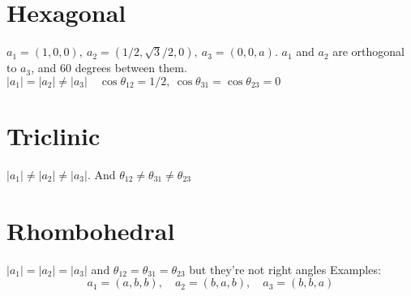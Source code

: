 \documentclass[main.tex]{subfiles}
\begin{document}
	
	\section{Hexagonal}
	$ a_1 = (1,0,0),\ a_2 = (1/2,\sqrt{3}/2,0),\ a_3 = (0,0,a) $. $a_1$ and $a_2$ are orthogonal to $a_3$, and 60 degrees between them.
	$|a_1| = |a_2| \neq |a_3| \quad \cos \theta_{12} = 1/2, \ \cos \theta_{31} = \cos \theta_{23} = 0$
	
	\section{Triclinic}
	$|a_1| \neq |a_2| \neq |a_3|$. And $\theta_{12} \neq \theta_{31} \neq \theta_{23}$
	
	\section{Rhombohedral}
	$|a_1| = |a_2| = |a_3|$ and $\theta_{12} = \theta_{31} = \theta_{23}$ but they're not right angles
	Examples:
	\begin{equation}\label{key}
		a_1 = (a,b,b), \quad a_2 = (b,a,b), \quad a_3 = (b,b,a)
	\end{equation}
	
	
\end{document}
